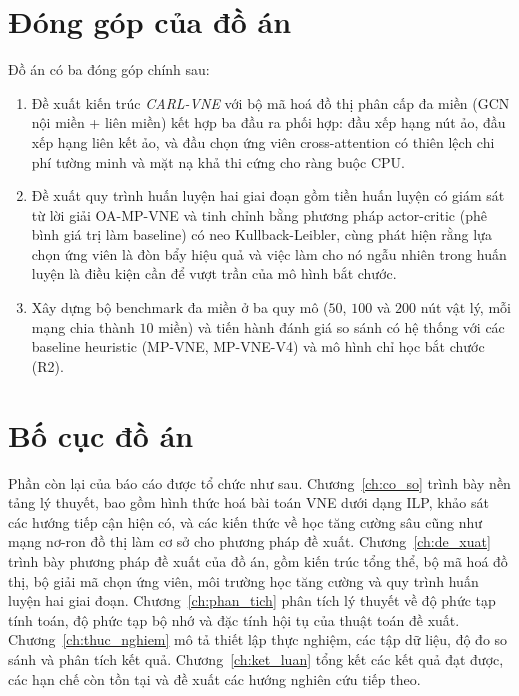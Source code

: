 \documentclass[../DoAn.tex]{subfiles}
\begin{document}
\section{Đóng góp của đồ án}

Đồ án có ba đóng góp chính sau:
\begin{enumerate}
\item Đề xuất kiến trúc \textit{CARL-VNE} với bộ mã hoá đồ thị phân cấp đa miền (GCN nội miền + liên miền) kết hợp ba đầu ra phối hợp: đầu xếp hạng nút ảo, đầu xếp hạng liên kết ảo, và đầu chọn ứng viên cross-attention có thiên lệch chi phí tường minh và mặt nạ khả thi cứng cho ràng buộc CPU.
\item Đề xuất quy trình huấn luyện hai giai đoạn gồm tiền huấn luyện có giám sát từ lời giải OA-MP-VNE và tinh chỉnh bằng phương pháp actor-critic (phê bình giá trị làm baseline) có neo Kullback-Leibler, cùng phát hiện rằng lựa chọn ứng viên là đòn bẩy hiệu quả và việc làm cho nó ngẫu nhiên trong huấn luyện là điều kiện cần để vượt trần của mô hình bắt chước.
\item Xây dựng bộ benchmark đa miền ở ba quy mô ($50$, $100$ và $200$ nút vật lý, mỗi mạng chia thành $10$ miền) và tiến hành đánh giá so sánh có hệ thống với các baseline heuristic (MP-VNE, MP-VNE-V4) và mô hình chỉ học bắt chước (R2).
\end{enumerate}

\section{Bố cục đồ án}

Phần còn lại của báo cáo được tổ chức như sau. Chương~\ref{ch:co_so} trình bày nền tảng lý thuyết, bao gồm hình thức hoá bài toán VNE dưới dạng ILP, khảo sát các hướng tiếp cận hiện có, và các kiến thức về học tăng cường sâu cũng như mạng nơ-ron đồ thị làm cơ sở cho phương pháp đề xuất. Chương~\ref{ch:de_xuat} trình bày phương pháp đề xuất của đồ án, gồm kiến trúc tổng thể, bộ mã hoá đồ thị, bộ giải mã chọn ứng viên, môi trường học tăng cường và quy trình huấn luyện hai giai đoạn. Chương~\ref{ch:phan_tich} phân tích lý thuyết về độ phức tạp tính toán, độ phức tạp bộ nhớ và đặc tính hội tụ của thuật toán đề xuất. Chương~\ref{ch:thuc_nghiem} mô tả thiết lập thực nghiệm, các tập dữ liệu, độ đo so sánh và phân tích kết quả. Chương~\ref{ch:ket_luan} tổng kết các kết quả đạt được, các hạn chế còn tồn tại và đề xuất các hướng nghiên cứu tiếp theo.
\end{document}
